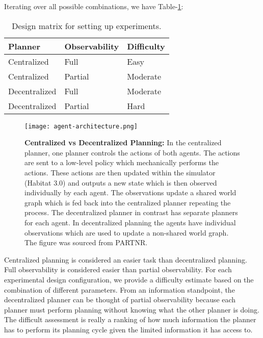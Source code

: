 Iterating over all possible combinations, we have Table-\ref{tab:experiment_design}:

\begin{table}[ht]
      \centering
      \selectfont
      \begin{tabular}{lll}
            \toprule
            Planner       & Observability & Difficulty \\
            \midrule
            Centralized   & Full          & Easy       \\
            Centralized   & Partial       & Moderate   \\
            Decentralized & Full          & Moderate   \\
            Decentralized & Partial       & Hard       \\
            \bottomrule
      \end{tabular}
      \caption{Design matrix for setting up experiments.}
      \label{tab:experiment_design}
\end{table}

\begin{figure*}
      \texttt{[image: agent-architecture.png]}
      \caption{\textbf{Centralized vs Decentralized Planning:} In the centralized planner, one planner controls the actions of both agents.  The actions are sent to a low-level policy which mechanically performs the actions.  These actions are then updated within the simulator (Habitat 3.0) and outputs a new state which is then observed individually by each agent.  The observations update a shared world graph which is fed back into the centralized planner repeating the process.  The decentralized planner in contrast has separate planners for each agent.  In decentralized planning the agents have individual observations which are used to update a non-shared world graph.  The figure was sourced from PARTNR\cite{chang2024partnrbenchmarkplanningreasoning}.}
      \label{fig:central_vs_decentral}
\end{figure*}

Centralized planning is considered an easier task than decentralized planning.  Full observability is considered easier than partial observability.  For each experimental design configuration, we provide a difficulty estimate based on the combination of different parameters.  From an information standpoint, the decentralized planner can be thought of partial observability because each planner must perform planning without knowing what the other planner is doing.  The difficult assessment is really a ranking of how much information the planner has to perform its planning cycle given the limited information it has access to.

